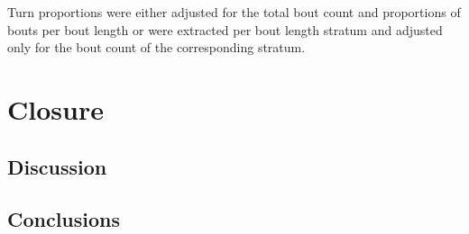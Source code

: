 \documentclass[a4paper,12pt]{article}
\begin{document}
Turn proportions were either adjusted for the total bout count and proportions of bouts per bout length or were extracted per bout length stratum and adjusted only for the bout count of the corresponding stratum. 
\section{Closure}
\subsection{Discussion}


\subsection{Conclusions}


\end{document}

